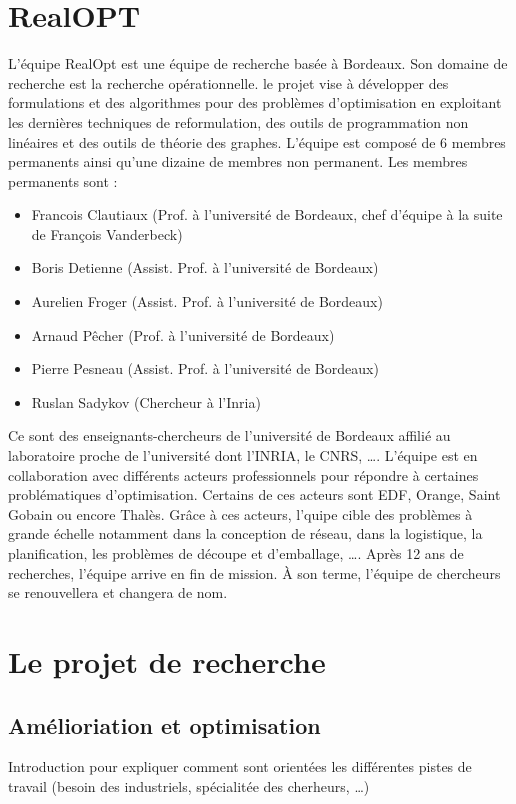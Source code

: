 \documentclass[12pt]{article}
\begin{document}
    \section{RealOPT}\label{sec:realopt}
    L'équipe RealOpt est une équipe de recherche basée à Bordeaux.
    Son domaine de recherche est la recherche opérationnelle.
    le projet vise à développer des formulations et des algorithmes pour des problèmes d'optimisation en exploitant les dernières techniques de reformulation, des outils de programmation non linéaires et des outils de théorie des graphes.
    L'équipe est composé de 6 membres permanents ainsi qu'une dizaine de membres non permanent.
    Les membres permanents sont :
    \begin{itemize}
        \item Francois Clautiaux  (Prof. à l'université de Bordeaux, chef d'équipe à la suite de
        François Vanderbeck)
        \item Boris Detienne (Assist. Prof. à l'université de Bordeaux)
        \item Aurelien Froger (Assist. Prof. à l'université de Bordeaux)
        \item Arnaud Pêcher (Prof. à l'université de Bordeaux)
        \item Pierre Pesneau (Assist. Prof. à l'université de Bordeaux)
        \item Ruslan Sadykov (Chercheur à l'Inria)
    \end{itemize}
    Ce sont des enseignants-chercheurs de l'université de Bordeaux affilié au laboratoire proche de l'université
    dont l'INRIA, le CNRS, \ldots .
    L'équipe est en collaboration avec différents acteurs professionnels pour répondre à certaines problématiques
    d'optimisation.
    Certains de ces acteurs sont EDF, Orange, Saint Gobain ou encore Thalès. Grâce à ces acteurs, l'quipe cible des problèmes à grande échelle notamment dans la conception de réseau, dans la logistique, la planification, les problèmes de découpe et d'emballage, \ldots .
    Après 12 ans de recherches, l'équipe arrive en fin de mission.
    À son terme, l'équipe de chercheurs se renouvellera et changera de nom.

    \section{Le projet de recherche}\label{sec:le-projet-de-recherche}
    \subsection{Amélioriation et optimisation}\label{subsec:amelioriation-et-optimisation}
    Introduction pour expliquer comment sont orientées les différentes pistes de travail
    (besoin des industriels, spécialitée des cherheurs, \ldots)
\end{document}
